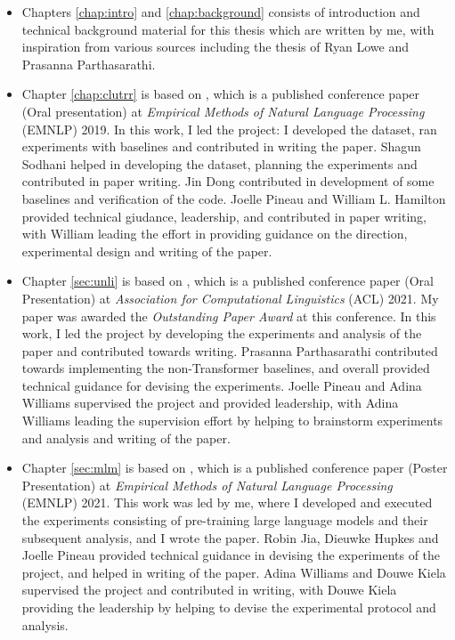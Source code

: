 \documentclass[letterpaper, 12pt]{report}
\begin{document}
\begin{itemize}
  \item Chapters \autoref{chap:intro} and \autoref{chap:background} consists of introduction and technical background material for this thesis which are written by me, with inspiration from various sources including the thesis of Ryan Lowe and Prasanna Parthasarathi.
  \item Chapter \autoref{chap:clutrr} is based on \cite{sinha-etal-2019-clutrr}, which is a published conference paper (Oral presentation) at \textit{Empirical Methods of Natural Language Processing} (EMNLP) 2019. In this work, I led the project: I developed the dataset, ran experiments with baselines and contributed in writing the paper. Shagun Sodhani helped in developing the dataset, planning the experiments and contributed in paper writing. Jin Dong contributed in development of some baselines and verification of the code. Joelle Pineau and William L. Hamilton provided technical giudance, leadership, and contributed in paper writing, with William leading the effort in providing guidance on the direction, experimental design and writing of the paper.
  \item Chapter \autoref{sec:unli} is based on \cite{sinha-etal-2021-unnatural}, which is a published conference paper (Oral Presentation) at \textit{Association for Computational Linguistics} (ACL) 2021. My paper was awarded the \textit{Outstanding Paper Award} at this conference. In this work, I led the project by developing the experiments and analysis of the paper and contributed towards writing. Prasanna Parthasarathi contributed towards implementing the non-Transformer baselines, and overall provided technical guidance for devising the experiments. Joelle Pineau and Adina Williams supervised the project and provided leadership, with Adina Williams leading the supervision effort by helping to brainstorm experiments and analysis and writing of the paper.
  \item Chapter \autoref{sec:mlm} is based on \cite{sinha-etal-2021-masked}, which is a published conference paper (Poster Presentation) at \textit{Empirical Methods of Natural Language Processing} (EMNLP) 2021. This work was led by me, where I developed and executed the experiments consisting of pre-training large language models and their subsequent analysis, and I wrote the paper. Robin Jia, Dieuwke Hupkes and Joelle Pineau provided technical guidance in devising the experiments of the project, and helped in writing of the paper. Adina Williams and Douwe Kiela supervised the project and contributed in writing, with Douwe Kiela providing the leadership by helping to devise the experimental protocol and analysis.

\end{itemize}
\end{document}

